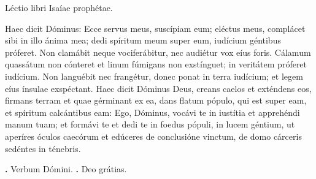 
Léctio libri Isaíae prophétae.

Haec dicit Dóminus:
Ecce servus meus, suscípiam eum; eléctus meus, complácet sibi in illo ánima mea; dedi spíritum meum super eum, iudícium géntibus próferet. Non clamábit neque vociferábitur, nec audiétur vox eíus foris. Cálamum quassátum non cónteret et linum fúmigans non exstínguet; in veritátem próferet iudícium. Non languébit nec frangétur, donec ponat in terra iudícium; et legem eíus ínsulae exspéctant. Haec dicit Dóminus Deus, creans caelos et exténdens eos, firmans terram et quae gérminant ex ea, dans flatum pópulo, qui est super eam, et spíritum calcántibus eam: Ego, Dóminus, vocávi te in iustítia et apprehéndi manum tuam; et formávi te et dedi te in foedus pópuli, in lucem géntium, ut aperíres óculos caecórum et edúceres de conclusióne vinctum, de domo cárceris sedéntes in ténebris.

\textbf{\Vbar.} Verbum Dómini.
\textbf{\Rbar.} Deo grátias.
\par